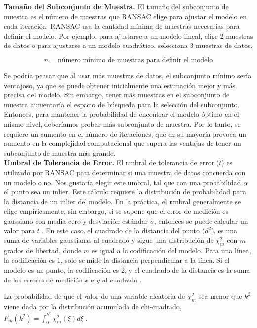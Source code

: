 \textbf{Tamaño del Subconjunto de Muestra.}
El tamaño del subconjunto de muestra es el número de muestras que RANSAC elige para ajustar el modelo en cada iteración. RANSAC usa la cantidad mínima de muestras necesarias para definir el modelo. Por ejemplo, para ajustarse a un modelo lineal, elige 2 muestras de datos o para ajustarse a un modelo cuadrático, selecciona 3 muestras de datos.

$$n = \text{número mínimo de muestras para definir el modelo}$$

Se podría pensar que al usar más muestras de datos, el subconjunto mínimo sería ventajoso, ya que se puede obtener inicialmente una estimación mejor y más precisa del modelo. Sin embargo, tener más muestras en el subconjunto de muestra aumentaría el espacio de búsqueda para la selección del subconjunto. Entonces, para mantener la probabilidad de encontrar el modelo óptimo en el mismo nivel, deberíamos probar más subconjunto de muestra. Por lo tanto, se requiere un aumento en el número de iteraciones, que en su mayoría provoca un aumento en la complejidad computacional que supera las ventajas de tener un subconjunto de muestra más grande.\\

\textbf{Umbral de Tolerancia de Error.}
El umbral de tolerancia de error ($t$) es utilizado por RANSAC para determinar si una muestra de datos concuerda con un modelo o no. Nos gustaría elegir este umbral, tal que con una probabilidad $\alpha$ el punto sea un inlier. Este cálculo requiere la distribución de probabilidad para la distancia de un inlier del modelo. En la práctica, el umbral generalmente se elige empíricamente, sin embargo, si se supone que el error de medición es gaussiano con media cero y desviación estándar $\sigma$, entonces se puede calcular un valor para $t$ \cite{RichardAndrew}. En este caso, el cuadrado de la distancia del punto ($d^2$), es una suma de variables gaussianas al cuadrado y sigue una distribución de $\chi_{m}^2$ con $m$ grados de libertad, donde $m$ es igual a la codificación del modelo. Para una línea, la codificación es $1$, solo se mide la distancia perpendicular a la línea. Si el modelo es un punto, la codificación es $2$, y el cuadrado de la distancia es la suma de los errores de medición $x$ e $y$ al cuadrado \cite{RichardAndrew}.

La probabilidad de que el valor de una variable aleatoria de $\chi_{m}^2$ sea menor que $k^2$ viene dada por la distribución acumulada de chi-cuadrado, $F_m(k^2) = \int_{0}^{k^2} \chi_{m}^2(\xi)d\xi$ \cite{RichardAndrew}.

